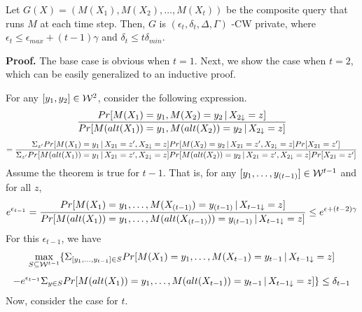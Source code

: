\documentclass[11pt]{article}
\begin{document}
\begin{theorem}
Let $G(X) = (M(X_{1}), M(X_{2}) , \dots, M(X_{t}))$ be the composite query that runs $M$ at each time step. Then, $G$ is $( \epsilon_{t},  \delta_{t}, \Delta, \Gamma)$ -CW private, where $ \epsilon_{t} \leq \epsilon_{max} + (t-1)\gamma$ and $\delta_{t} \leq t \delta_{min}$. 
\end{theorem}
{\bf Proof.} The base case is obvious when $t=1$. Next, we show the case when $t=2$, which can be easily generalized to an inductive proof.

For any $[y_{1}, y_{2}] \in {\cal W}^{2}$, consider the following expression.
\[
\frac{Pr[M(X_{1})=y_{1}, M(X_{2})=y_{2}\,|\,X_{2 \downarrow}=z]}{Pr[M(alt(X_{1}))=y_{1}, M(alt(X_{2}))=y_{2}\,|\,X_{2 \downarrow}=z]}
\]
\[
=\frac{\Sigma_{z'} Pr[M(X_{1})=y_{1}\,|\,X_{21}=z', X_{2 \downarrow}=z] Pr[M(X_{2})=y_{2}\,|\,X_{21}=z', X_{2 \downarrow}=z] Pr[X_{21}=z']}{\Sigma_{z'} Pr[M(alt(X_{1}))=y_{1}\,|\,X_{21}=z', X_{2 \downarrow}=z] Pr[M(alt(X_{2}))=y_{2}\,|\,X_{21}=z', X_{2 \downarrow}=z] Pr[X_{21}=z']}
\]
Assume the theorem is true for $t-1$. That is, for any $[y_{1}, \dots, y_{(t-1)}] \in {\cal W}^{t-1}$ and for all $z$,
\[
e^{\epsilon_{t-1}}=\frac{Pr[M(X_{1})=y_{1}, \dots , M(X_{(t-1)})=y_{(t-1)}\,|\,X_{t-1 \downarrow}=z] }{Pr[M(alt(X_{1}))=y_{1}, \dots , M(alt(X_{(t-1)}))=y_{(t-1)}\,|\,X_{t-1 \downarrow}=z] } \leq e^{ \epsilon+(t-2)\gamma}
\]
For this $\epsilon_{t-1}$, we have
\[
\max_{S \subseteq {\cal W}^{t-1}} \{ \Sigma_{[y_{1}, \dots, y_{t-1}] \in S}Pr[M(X_{1})=y_{1}, \dots , M(X_{t-1})=y_{t-1}\,|\,X_{t-1 \downarrow}=z] 
\]
\[
- e^{\epsilon_{t-1}}\Sigma_{y \in S}Pr[M(alt(X_{1}))=y_{1}, \dots , M(alt(X_{t-1}))=y_{t-1}\,|\,X_{t-1 \downarrow}=z] \} \leq \delta_{t-1}
\]
Now, consider the case for $t$. 
\end{document}

